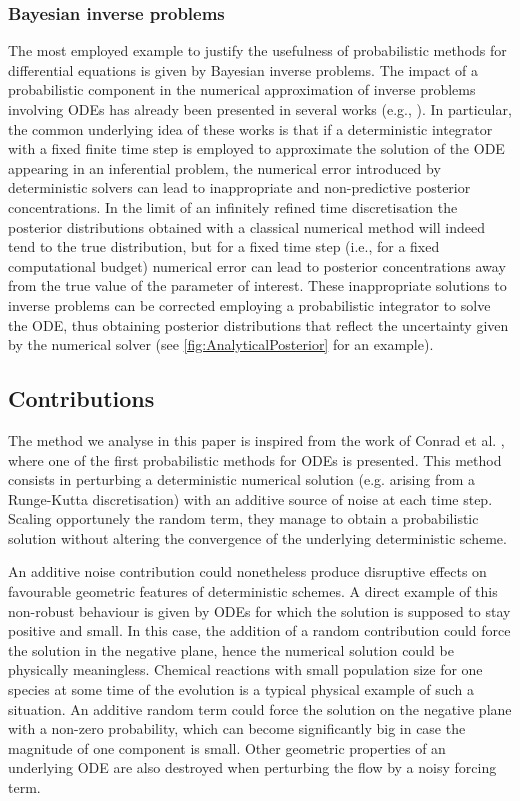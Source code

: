 \documentclass[10pt]{article}
\begin{document}
\subsubsection*{Bayesian inverse problems} The most employed example to justify the usefulness of probabilistic methods for differential equations is given by Bayesian inverse problems. The impact of a probabilistic component in the numerical approximation of inverse problems involving ODEs has already been presented in several works (e.g., \cite{CGS16, CCC16, COS17}). In particular, the common underlying idea of these works is that if a deterministic integrator with a fixed finite time step is employed to approximate the solution of the ODE appearing in an inferential problem, the numerical error introduced by deterministic solvers can lead to inappropriate and non-predictive posterior concentrations. In the limit of an infinitely refined time discretisation the posterior distributions obtained with a classical numerical method will indeed tend to the true distribution, but for a fixed time step (i.e., for a fixed computational budget) numerical error can lead to posterior concentrations away from the true value of the parameter of interest. These inappropriate solutions to inverse problems can be corrected employing a probabilistic integrator to solve the ODE, thus obtaining posterior distributions that reflect the uncertainty given by the numerical solver (see \cref{fig:AnalyticalPosterior} for an example).


\subsection{Contributions} The method we analyse in this paper is inspired from the work of Conrad et al. \cite{CGS16}, where one of the first probabilistic methods for ODEs is presented. This method consists in perturbing a deterministic numerical solution (e.g. arising from a Runge-Kutta discretisation) with an additive source of noise at each time step. Scaling opportunely the random term, they manage to obtain a probabilistic solution without altering the convergence of the underlying deterministic scheme. 

An additive noise contribution could nonetheless produce disruptive effects on favourable geometric features of deterministic schemes. A direct example of this non-robust behaviour is given by ODEs for which the solution is supposed to stay positive and small. In this case, the addition of a random contribution could force the solution in the negative plane, hence the numerical solution could be physically meaningless. Chemical reactions with small population size for one species at some time of the evolution is a typical physical example of such a situation. An additive random term could force the solution on the negative plane with a non-zero probability, which can become significantly big in case the magnitude of one component is small. Other geometric properties of an underlying ODE are also destroyed when perturbing the flow by a noisy forcing term.
\end{document}
